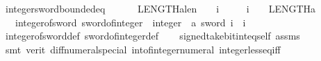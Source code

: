 \begin{isabellebody}
\isanewline
%
\endisadelimproof
\isanewline
{}\isamarkupfalse%
\ integer{\isacharunderscore}{\kern0pt}sword{\isacharunderscore}{\kern0pt}bounded{\isacharunderscore}{\kern0pt}eq{\isacharcolon}{\kern0pt}\isanewline
\ \ \ {\isachardoublequoteopen}{\isacharminus}{\kern0pt}\ {\isacharparenleft}{\kern0pt}{}\ {\isacharcircum}{\kern0pt}\ {\isacharparenleft}{\kern0pt}LENGTH{\isacharparenleft}{\kern0pt}{\isacharprime}{\kern0pt}a{\isacharcolon}{\kern0pt}{\isacharcolon}{\kern0pt}len{\isacharparenright}{\kern0pt}\ {\isacharminus}{\kern0pt}\ {}{\isacharparenright}{\kern0pt}{\isacharparenright}{\kern0pt}\ {\isasymle}\ i{\isachardoublequoteclose}\isanewline
\ \ \ \ \ {\isachardoublequoteopen}i\ {\isacharless}{\kern0pt}\ {}\ {\isacharcircum}{\kern0pt}\ {\isacharparenleft}{\kern0pt}LENGTH{\isacharparenleft}{\kern0pt}{\isacharprime}{\kern0pt}a{\isacharparenright}{\kern0pt}\ {\isacharminus}{\kern0pt}\ {}{\isacharparenright}{\kern0pt}{\isachardoublequoteclose}\isanewline
\ \ \ {\isachardoublequoteopen}integer{\isacharunderscore}{\kern0pt}of{\isacharunderscore}{\kern0pt}sword\ {\isacharparenleft}{\kern0pt}{\isacharparenleft}{\kern0pt}sword{\isacharunderscore}{\kern0pt}of{\isacharunderscore}{\kern0pt}integer\ {\isacharcolon}{\kern0pt}{\isacharcolon}{\kern0pt}\ integer\ {\isasymRightarrow}\ {\isacharprime}{\kern0pt}a\ sword{\isacharparenright}{\kern0pt}\ i{\isacharparenright}{\kern0pt}\ {\isacharequal}{\kern0pt}\ i{\isachardoublequoteclose}\isanewline
%
\isadelimproof
\ \ %
\endisadelimproof
%
\isatagproof
{}\isamarkupfalse%
\ integer{\isacharunderscore}{\kern0pt}of{\isacharunderscore}{\kern0pt}sword{\isacharunderscore}{\kern0pt}def\ sword{\isacharunderscore}{\kern0pt}of{\isacharunderscore}{\kern0pt}integer{\isacharunderscore}{\kern0pt}def\isanewline
\ \ \isamarkupfalse%
\ signed{\isacharunderscore}{\kern0pt}take{\isacharunderscore}{\kern0pt}bit{\isacharunderscore}{\kern0pt}int{\isacharunderscore}{\kern0pt}eq{\isacharunderscore}{\kern0pt}self\ assms\ \isanewline
\ \ \isamarkupfalse%
\ {\isacharparenleft}{\kern0pt}smt\ {\isacharparenleft}{\kern0pt}verit{\isacharparenright}{\kern0pt}\ diff{\isacharunderscore}{\kern0pt}numeral{\isacharunderscore}{\kern0pt}special{\isacharparenleft}{\kern0pt}{}{}{\isacharparenright}{\kern0pt}\ int{\isacharunderscore}{\kern0pt}of{\isacharunderscore}{\kern0pt}integer{\isacharunderscore}{\kern0pt}numeral\ integer{\isacharunderscore}{\kern0pt}less{\isacharunderscore}{\kern0pt}eq{\isacharunderscore}{\kern0pt}iff\ \isanewline

\end{isabellebody}
